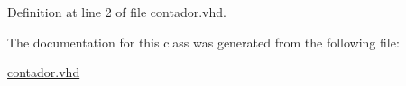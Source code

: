 \subsubsection[{S\+T\+D\+\_\+\+L\+O\+G\+I\+C\+\_\+\+U\+N\+S\+I\+G\+N\+E\+D}]{\hspace{0.3cm}{\ttfamily [Package]}}\label{classcontador_a241c3e72dd8024cc8ae831b1b2aed7db}


Definition at line 2 of file contador.\+vhd.



The documentation for this class was generated from the following file\+:\begin{DoxyCompactItemize}
\item 
\hyperlink{contador_8vhd}{contador.\+vhd}\end{DoxyCompactItemize}

